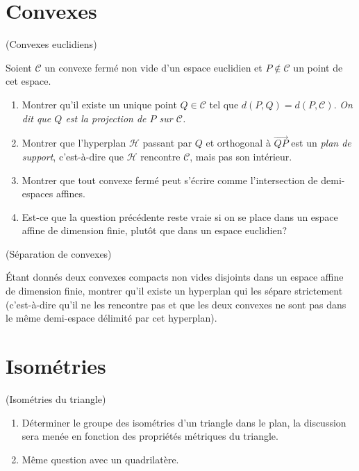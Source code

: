 \documentclass[a4paper,12pt,reqno]{amsart}
\begin{document}
\section{Convexes}

\begin{exo} (Convexes euclidiens)

    Soient $\mathcal{C}$ un convexe fermé non vide d'un espace euclidien et $P \notin \mathcal{C}$ un point de cet espace.
    \begin{enumerate}
       \item Montrer qu'il existe un unique point $Q \in \mathcal{C}$ tel que $d(P,Q) = d(P,\mathcal{C})$. \newline
       \emph{On dit que $Q$ est la projection de $P$ sur $\mathcal{C}$.}

       \item Montrer que l'hyperplan $\mathcal{H}$ passant par $Q$ et orthogonal à $\overrightarrow{QP}$ est un \emph{plan de support}, c'est-à-dire que $\mathcal{H}$ rencontre $\mathcal{C}$, mais pas son intérieur.

       \item Montrer que tout convexe fermé peut s'écrire comme l'intersection de demi-espaces affines.

       \item Est-ce que la question précédente reste vraie si on se place dans un espace affine de dimension finie, plutôt que dans un espace euclidien?
     \end{enumerate}
\end{exo}

\begin{exo} (Séparation de convexes)

  Étant donnés deux convexes compacts non vides disjoints dans un espace affine de dimension finie, montrer qu'il existe un hyperplan qui les sépare strictement (c'est-à-dire qu'il ne les rencontre pas et que les deux convexes ne sont pas dans le même demi-espace délimité par cet hyperplan).
\end{exo}


\section{Isométries}
\begin{exo} (Isométries du triangle)
  \begin{enumerate}
    \item Déterminer le groupe des isométries d'un triangle dans le plan, la discussion sera menée en fonction des propriétés métriques du triangle.
    \item Même question avec un quadrilatère.
  \end{enumerate}
\end{exo}
\end{document}
